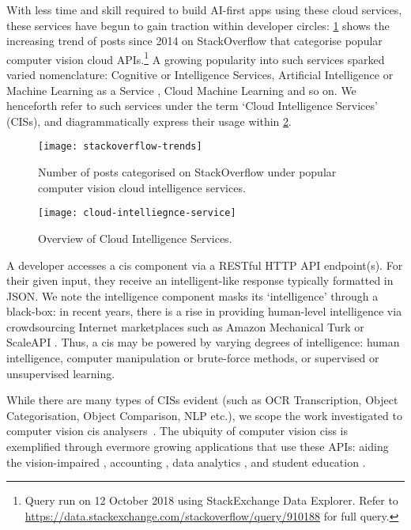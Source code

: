 With less time and skill required to build \gls{AI}-first apps using these cloud services,  these services have begun to gain traction within developer circles: \cref{fig:introduction:stackoverflow-trends} shows the increasing trend of posts since 2014 on StackOverflow that categorise popular computer vision cloud APIs.\footnote{Query run on 12 October 2018 using StackExchange Data Explorer. Refer to \url{https://data.stackexchange.com/stackoverflow/query/910188} for full query.} A growing popularity into such services sparked varied nomenclature: Cognitive or Intelligence Services, Artificial Intelligence or Machine Learning as a Service \citep{Ribeiro:2015dz}, Cloud Machine Learning and so on. We henceforth refer to such services under the term `Cloud Intelligence Services' (\glspl{CIS}), and diagrammatically express their usage within \cref{fig:introduction:cloud-intelliegnce-service}.

\begin{figure}[t]
\centering
\caption[Increasing interest in the developer community of computer vision APIs]{Number of posts categorised on StackOverflow under popular computer vision cloud intelligence services.}
\label{fig:introduction:stackoverflow-trends}
\texttt{[image: stackoverflow-trends]}
\end{figure}

\begin{figure}[th]
\centering
\caption[Overview of cloud intelligence services]{Overview of Cloud Intelligence Services.}
\label{fig:introduction:cloud-intelliegnce-service}
\texttt{[image: cloud-intelliegnce-service]}
\end{figure}
 
 
A developer accesses a \gls{cis} component via a RESTful HTTP API endpoint(s). For their given input, they receive an intelligent-like response typically formatted in JSON. We note the intelligence component masks its `intelligence' through a black-box: in recent years, there is a rise in providing human-level intelligence via crowdsourcing Internet marketplaces such as Amazon Mechanical Turk \citep{MTurk:Home} or ScaleAPI \citep{ScaleAPI:Home}. Thus, a \gls{cis} may be powered by varying degrees of intelligence: human intelligence, computer manipulation or brute-force methods, or supervised or unsupervised learning.

While there are many types of \glspl{CIS} evident (such as OCR Transcription, Object Categorisation, Object Comparison, NLP etc.), we scope the work investigated to computer vision \gls{cis} analysers~\citep{GoogleCloud:Home,Azure:Home,AWS:Home,Pixlab:Home,IBM:Home,Cloudsight:Home,Clarifai:Home,DeepAI:Home,Imagaa:Home,Talkwaler:Home,Kairos:Home,Cognitec:Home,Affectiva:Home}. The ubiquity of computer vision \glspl{cis} is exemplified through evermore growing applications that use these APIs: aiding the vision-impaired \citep{Reis:2018cp,daMotaSilveira:2017vp}, accounting  \citep{Marshall:2018uj}, data analytics \citep{Iyengar:2017fb}, and student education \citep{Dibia:2017iy}.